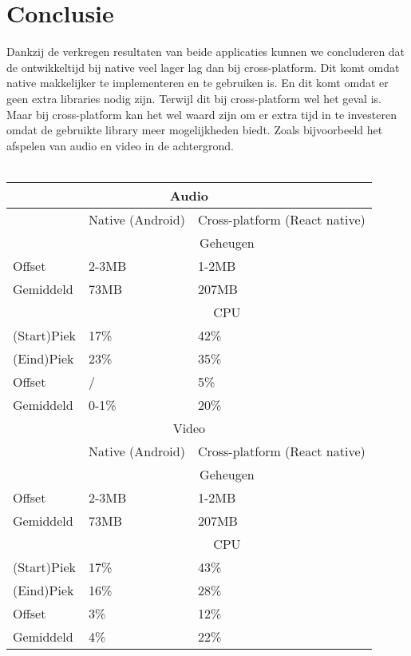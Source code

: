 \section{Conclusie}
Dankzij de verkregen resultaten van beide applicaties kunnen we concluderen dat de ontwikkeltijd bij 
native veel lager lag dan bij cross-platform. Dit komt omdat native makkelijker te implementeren en te gebruiken is.
En dit komt omdat er geen extra libraries nodig zijn. Terwijl dit bij cross-platform wel het geval is.
Maar bij cross-platform kan het wel waard zijn om er extra tijd in te investeren omdat de gebruikte library 
meer mogelijkheden biedt. Zoals bijvoorbeeld het afspelen van audio en video in de achtergrond.
\\\\
\begin{tabular}{ |p{3cm}||p{5cm}|p{5cm}| }
    \hline
    \multicolumn{3}{|c|}{Audio} \\ 
    \hline
     & Native (Android) & Cross-platform (React native) \\
    \hline
     & \multicolumn{2}{|c|}{Geheugen} \\ 
    \hline
    Offset & 2-3MB & 1-2MB \\
    Gemiddeld & 73MB & 207MB \\
    \hline
     & \multicolumn{2}{|c|}{CPU} \\
    \hline
    (Start)Piek & 17\% & 42\% \\
    (Eind)Piek & 23\% & 35\% \\
    Offset & / & 5\% \\
    Gemiddeld & 0-1\% & 20\% \\
    \hline
    \multicolumn{3}{|c|}{Video} \\ 
    \hline
     & Native (Android) & Cross-platform (React native) \\
    \hline
     & \multicolumn{2}{|c|}{Geheugen} \\ 
    \hline
    Offset & 2-3MB & 1-2MB \\
    Gemiddeld & 73MB & 207MB \\
    \hline
     & \multicolumn{2}{|c|}{CPU} \\
    \hline
    (Start)Piek & 17\% & 43\% \\
    (Eind)Piek & 16\% & 28\% \\
    Offset & 3\% & 12\% \\
    Gemiddeld & 4\% & 22\% \\
    \hline
\end{tabular}
\\\\
